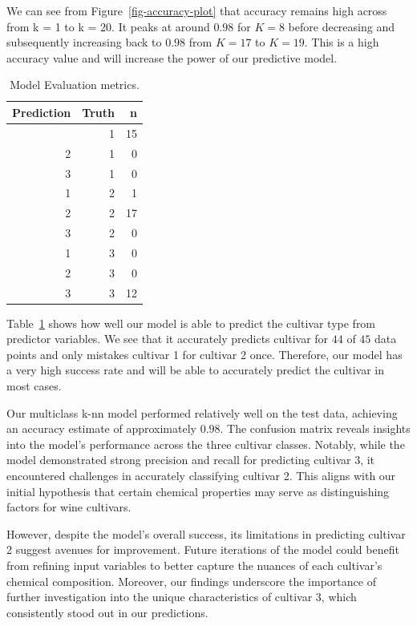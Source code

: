 \documentclass[
  letterpaper,
  DIV=11,
  numbers=noendperiod]{scrartcl}
\begin{document}
We can see from Figure~\ref{fig-accuracy-plot} that accuracy remains
high across from k = 1 to k = 20. It peaks at around \(0.98 %
\) for \(K = 8\) before decreasing and subsequently increasing back to
\(0.98 %
\) from \(K = 17\) to \(K = 19\). This is a high accuracy value and will
increase the power of our predictive model.

\begin{longtable}[]{@{}rrr@{}}

\caption{\label{tbl-metrics}Model Evaluation metrics.}

\tabularnewline

\toprule\noalign{}
Prediction & Truth & n \\
\midrule\noalign{}
\endhead
\bottomrule\noalign{}
\endlastfoot
1 & 1 & 15 \\
2 & 1 & 0 \\
3 & 1 & 0 \\
1 & 2 & 1 \\
2 & 2 & 17 \\
3 & 2 & 0 \\
1 & 3 & 0 \\
2 & 3 & 0 \\
3 & 3 & 12 \\

\end{longtable}

Table~\ref{tbl-metrics} shows how well our model is able to predict the
cultivar type from predictor variables. We see that it accurately
predicts cultivar for \(44\) of \(45\) data points and only mistakes
cultivar 1 for cultivar 2 once. Therefore, our model has a very high
success rate and will be able to accurately predict the cultivar in most
cases.

Our multiclass k-nn model performed relatively well on the test data,
achieving an accuracy estimate of approximately \(0.98 %
\). The confusion matrix reveals insights into the model's performance
across the three cultivar classes. Notably, while the model demonstrated
strong precision and recall for predicting cultivar 3, it encountered
challenges in accurately classifying cultivar 2. This aligns with our
initial hypothesis that certain chemical properties may serve as
distinguishing factors for wine cultivars.

However, despite the model's overall success, its limitations in
predicting cultivar 2 suggest avenues for improvement. Future iterations
of the model could benefit from refining input variables to better
capture the nuances of each cultivar's chemical composition. Moreover,
our findings underscore the importance of further investigation into the
unique characteristics of cultivar 3, which consistently stood out in
our predictions.
\end{document}
